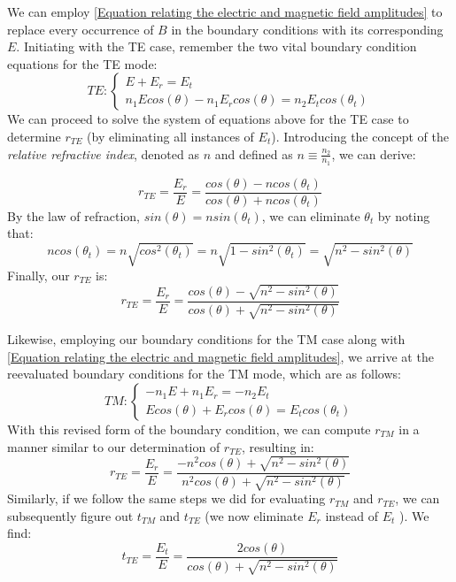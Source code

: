 We can employ \ref{Equation relating the electric and magnetic field amplitudes} to replace every occurrence of \(B\) in the boundary conditions with its corresponding \(E\). Initiating with the TE case, remember the two vital boundary condition equations for the TE mode:
\begin{equation}
TE:
\begin{cases} \label{TE boundary conditions}
  E + E_r = E_t \\
  n_1Ecos(\theta) - n_1E_rcos(\theta) = n_2E_tcos(\theta_t)
\end{cases}
\end{equation}
We can proceed to solve the system of equations above for the TE case to determine $r_{TE}$ (by eliminating all instances of $E_t$). Introducing the concept of the \textit{relative refractive index}, denoted as $n$ and defined as $n \equiv \frac{n_2}{n_1}$, we can derive:

\begin{equation} \label{Reflection coefficient (TE) in terms of n}
r_{TE} = \frac{E_r}{E} = \frac{cos(\theta) - ncos(\theta_t)}{cos(\theta) + ncos(\theta_t)}
\end{equation}
By the law of refraction, $sin(\theta) = nsin(\theta_t)$, we can eliminate $\theta_t$ by noting that:
\begin{equation} \label{Replacing \theta_t using the law of refraction}
ncos(\theta_t) = n \sqrt{cos^{2}(\theta_t)} = n\sqrt{1 - sin^2(\theta_t)} = \sqrt{n^2 - sin^2(\theta)}
\end{equation}
Finally, our $r_{TE}$ is:
\begin{equation} \label{Reflection coefficient (TE) without \theta_t}
r_{TE} = \frac{E_r}{E} = \frac{cos(\theta) - \sqrt{n^2 - sin^2(\theta)}}{cos(\theta) + \sqrt{n^2 - sin^2(\theta)}}
\end{equation}

Likewise, employing our boundary conditions for the TM case along with \ref{Equation relating the electric and magnetic field amplitudes}, we arrive at the reevaluated boundary conditions for the TM mode, which are as follows:
\begin{equation}
TM:
\begin{cases} \label{TM boundary conditions}
  -n_1E + n_1E_r = -n_2E_t \\
  Ecos(\theta) + E_rcos(\theta) = E_tcos(\theta_t)
\end{cases}
\end{equation}
With this revised form of the boundary condition, we can compute $r_{TM}$ in a manner similar to our determination of $r_{TE}$, resulting in:
\begin{equation}
r_{TE} = \frac{E_r}{E} = \frac{-n^2cos(\theta) + \sqrt{n^2 - sin^2(\theta)}}{n^2cos(\theta) + \sqrt{n^2 - sin^2(\theta)}}
\end{equation}
Similarly, if we follow the same steps we did for evaluating $r_{TM}$ and $r_{TE}$, we can subsequently figure out $t_{TM}$ and $t_{TE}$ (we now eliminate $E_r$ instead of $E_t$ ). We find:
\begin{equation} \label{Transmission coefficient (TE) without \theta_t}
t_{TE} = \frac{E_t}{E} = \frac{2cos(\theta)}{cos(\theta) + \sqrt{n^2 - sin^2(\theta)}}
\end{equation}

